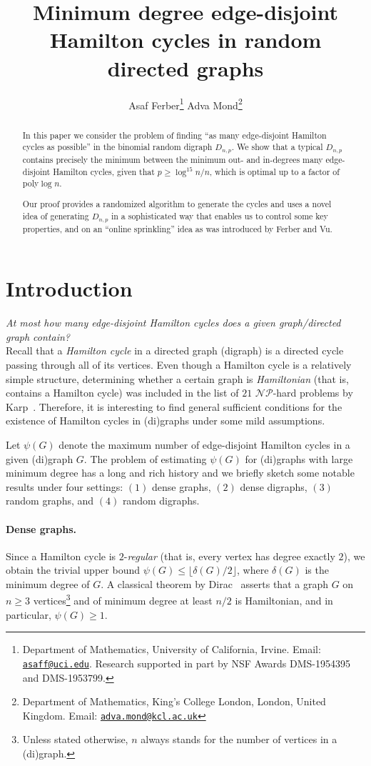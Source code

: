 \documentclass{article}
\title{Minimum degree edge-disjoint Hamilton cycles in random directed graphs}
\author{Asaf Ferber\thanks{Department of Mathematics, University of California, Irvine. Email: \href{mailto:asaff@uci.edu} {\nolinkurl{asaff@uci.edu}}. Research supported in part by NSF Awards DMS-1954395 and DMS-1953799.} \hspace{10mm} Adva Mond\thanks{Department of Mathematics, King's College London, London, United Kingdom. Email: \href{mailto:adva.mond@kcl.ac.uk}{\nolinkurl{adva.mond@kcl.ac.uk}}}}
\date{}
\begin{document}
	
	\maketitle
	
	\begin{abstract}
		In this paper we consider the problem of finding ``as many edge-disjoint Hamilton cycles as possible'' in the binomial random digraph $D_{n,p}$.
		We show that a typical $D_{n,p}$ contains precisely the minimum between the minimum out- and in-degrees many edge-disjoint Hamilton cycles, given that $p\geq \log^{15} n/n$, which is optimal up to a factor of poly$\log n$. 
		
		Our proof provides a randomized algorithm to generate the cycles and uses a novel idea of generating $D_{n,p}$ in a sophisticated way that enables us to control some key properties, and on an ``online sprinkling'' idea as was introduced by Ferber and Vu.
	\end{abstract}
	
	
	\section{Introduction}
	\emph{At most how many edge-disjoint Hamilton cycles does a given graph/directed graph contain?}\\ 
	Recall that a \emph{Hamilton cycle} in a directed graph (digraph) is a directed cycle passing through all of its vertices.
	Even though a Hamilton cycle is a relatively simple structure, determining whether a certain graph is \emph{Hamiltonian} (that is, contains a Hamilton cycle) was included in the list of $21$ $\mathcal{NP}$-hard problems by Karp~\cite{karp1972reducibility}. Therefore, it is interesting to find general sufficient conditions for the existence of Hamilton cycles in (di)graphs under some mild assumptions.
	
	Let $\psi(G)$ denote the maximum number of edge-disjoint Hamilton cycles in a given (di)graph $G$. The problem of estimating $\psi(G)$ for (di)graphs with large minimum degree has a long and rich history and we briefly sketch some notable results under four settings: $(1)$ dense graphs, $(2)$ dense digraphs, $(3)$ random graphs, and $(4)$ random digraphs.
	
	
	
	
	
	
	\paragraph{Dense graphs.} 
	Since a Hamilton cycle is $2$-\emph{regular} (that is, every vertex has degree exactly $2$), we obtain the trivial upper bound $\psi(G)\leq \lfloor \delta(G)/2\rfloor$, where $\delta(G)$ is the minimum degree of $G$. A classical theorem by Dirac~\cite{Dirac} asserts that a graph $G$ on $n \ge 3$ vertices\footnote{Unless stated otherwise, $n$ always stands for the number of vertices in a (di)graph.} and of minimum degree at least $n/2$ is Hamiltonian, and in particular, $\psi(G)\geq 1$. 
	
\end{document}
